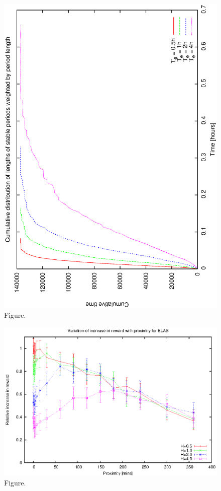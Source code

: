 \documentclass[12pt,a4paper]{article}
\begin{document}
\begin{figure}[htbp]
 \begin{center}
  \includegraphics[scale=1.0, angle=0]{figures/e_cumstats.eps}
 \end{center}
  \caption[Figure.]
{Figure.}
\end{figure}
\clearpage
\begin{figure}[htbp]
 \begin{center}
  \includegraphics[scale=1.0, angle=0]{figures/edv.eps}
 \end{center}
  \caption[Figure.]
{Figure.}
\end{figure}
\end{document}
